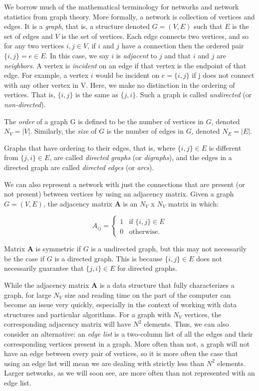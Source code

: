 \documentclass[12pt,twoside]{amherstthesis}
\begin{document}
  We borrow much of the mathematical terminology for networks and network
  statistics from graph theory. More formally, a network is collection of
  vertices and edges. It is a \emph{graph}, that is, a structure denoted
  \(G = (V, E)\) such that \(E\) is the set of edges and \(V\) is the set
  of vertices. Each edge connects two vertices, and so for any two
  vertices \(i, j \in V\), if \(i\) and \(j\) have a connection then the
  ordered pair \(\{i, j\} = e \in E\). In this case, we say \(i\) is
  \emph{adjacent} to \(j\) and that \(i\) and \(j\) are \emph{neighbors}.
  A vertex is \emph{incident} on an edge if that vertex is the endpoint of
  that edge. For example, a vertex \(i\) would be incident on
  \(e = \{i, j\}\) if j does not connect with any other vertex in V. Here,
  we make no distinction in the ordering of vertices. That is,
  \(\{i, j\}\) is the same as \(\{j, i\}\). Such a graph is called
  \emph{undirected} (or \emph{non-directed}).
  
  The \emph{order} of a graph G is defined to be the number of vertices in
  \(G\), denoted \(N_V = |V|\). Similarly, the \emph{size} of \(G\) is the
  number of edges in \(G\), denoted \(N_E = |E|\).
  
  Graphs that have ordering to their edges, that is, where
  \(\{i, j\} \in E\) is different from \(\{j, i\} \in E\), are called
  \emph{directed graphs} (or \emph{digraphs}), and the edges in a directed
  graph are called \emph{directed edges} (or \emph{arcs}).
  
  We can also represent a network with just the connections that are
  present (or not present) between vertices by using an adjacency matrix.
  Given a graph \(G = (V, E)\), the adjacency matrix \(\textbf{A}\) is an
  \(N_V\) x \(N_V\) matrix in which:
  
  \[ A_{ij} = \begin{cases}
      1 & \text{if } \{i, j\} \in E \\
      0 & \text{otherwise.} 
    \end{cases}
  \]
  
  Matrix \(\textbf{A}\) is symmetric if \(G\) is a undirected graph, but
  this may not necessarily be the case if \(G\) is a directed graph. This
  is because \(\{i, j\} \in E\) does not necessarily guarantee that
  \(\{j, i\} \in E\) for directed graphs.
  
  While the adjacency matrix \(\textbf{A}\) is a data structure that fully
  characterizes a graph, for large \(N_{V}\) size and reading time on the
  part of the computer can become an issue very quickly, especially in the
  context of working with data structures and particular algorithms. For a
  graph with \(N_{V}\) vertices, the corresponding adjacency matrix will
  have \(N^2\) elements. Thus, we can also consider an alternative: an
  \emph{edge list} is a two-column list of all the edges and their
  corresponding vertices present in a graph. More often than not, a graph
  will not have an edge between every pair of vertices, so it is more
  often the case that using an edge list will mean we are dealing with
  strictly less than \(N^2\) elements. Larger networks, as we will soon
  see, are more often than not represented with an edge list.
  
\end{document}
